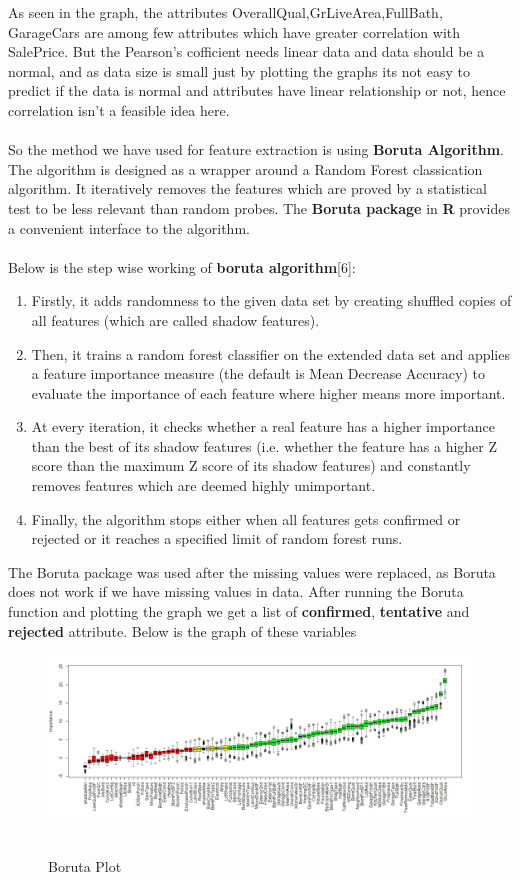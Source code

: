\documentclass[fleqn,10pt]{SelfArx} %
\begin{document}
As seen in the graph, the attributes OverallQual,GrLiveArea,FullBath, GarageCars are among few attributes which have greater correlation with SalePrice.
But the Pearson's cofficient needs linear data and data should be a normal, and as data size is small just by plotting the graphs its not easy to predict if the data is normal and attributes have linear relationship or not, hence correlation isn't a feasible idea here.
\\ \\ So the method we have used for feature extraction is using \textbf{Boruta Algorithm}. The algorithm is designed as a wrapper around a Random Forest classication algorithm. It iteratively removes the features which are proved by a statistical test to be less relevant than random probes. The \textbf{Boruta package} in \textbf{R} provides a convenient interface to the algorithm.
\\ \\Below is the step wise working of \textbf{boruta algorithm}[6]:
\begin{enumerate}[noitemsep]
\item Firstly, it adds randomness to the given data set by creating shuffled copies of all features (which are called shadow features).
\item Then, it trains a random forest classifier on the extended data set and applies a feature importance measure (the default is Mean Decrease Accuracy) to evaluate the importance of each feature where higher means more important.
\item At every iteration, it checks whether a real feature has a higher importance than the best of its shadow features (i.e. whether the feature has a higher Z score than the maximum Z score of its shadow features) and constantly removes features which are deemed highly unimportant.
\item Finally, the algorithm stops either when all features gets confirmed or rejected or it reaches a specified limit of random forest runs.
\end{enumerate}
The Boruta package was used after the missing values were replaced, as Boruta does not work if we have missing values in data.
After running the Boruta function and plotting the graph we get a list of \textbf{confirmed}, \textbf{tentative} and \textbf{rejected} attribute. Below is the graph of these variables
\begin{figure}[h]
\includegraphics[scale=0.17]{Boruta}
\\ \caption{\\Boruta Plot}
\end{figure}
\end{document}
